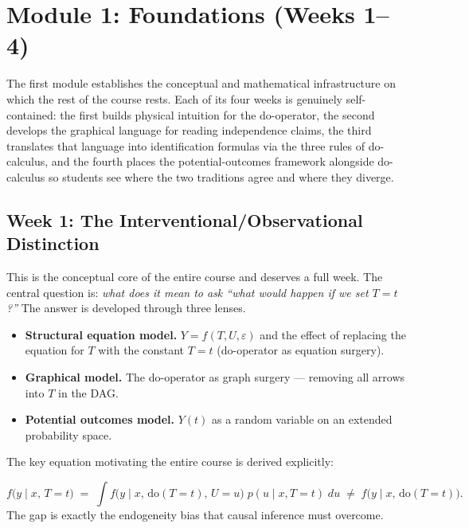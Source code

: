 \documentclass[12pt]{article}
\begin{document}
\section{Module 1: Foundations (Weeks 1--4)}

The first module establishes the conceptual and mathematical infrastructure
on which the rest of the course rests. Each of its four weeks is genuinely
self-contained: the first builds physical intuition for the do-operator, the
second develops the graphical language for reading independence claims, the
third translates that language into identification formulas via the three
rules of do-calculus, and the fourth places the potential-outcomes framework
alongside do-calculus so students see where the two traditions agree and
where they diverge.

\subsection{Week 1: The Interventional/Observational Distinction}

This is the conceptual core of the entire course and deserves a full week.
The central question is: \emph{what does it mean to ask ``what would happen
if we set $T = t$?''} The answer is developed through three lenses.

\begin{itemize}
  \item \textbf{Structural equation model.}
    $Y = f(T, U, \varepsilon)$ and the effect of replacing the equation for
    $T$ with the constant $T = t$ (do-operator as equation surgery).

  \item \textbf{Graphical model.}
    The do-operator as graph surgery --- removing all arrows into $T$ in the
    DAG.

  \item \textbf{Potential outcomes model.}
    $Y(t)$ as a random variable on an extended probability space.
\end{itemize}

The key equation motivating the entire course is derived explicitly:
\begin{keybox}
\[
  f\!\bigl(y \mid x,\, T{=}t\bigr)
  \;=\;
  \int f\!\bigl(y \mid x,\,\mathrm{do}(T{=}t),\, U{=}u\bigr)\;
       p(u \mid x, T{=}t)\; du
  \;\neq\;
  f\!\bigl(y \mid x,\,\mathrm{do}(T{=}t)\bigr).
\]
The gap is exactly the endogeneity bias that causal inference must overcome.
\end{keybox}
\end{document}
